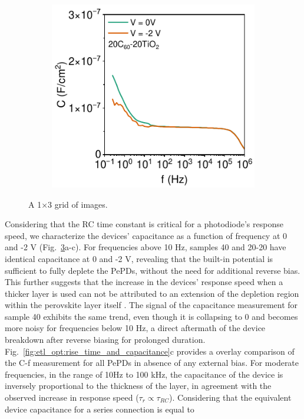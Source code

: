 \begin{figure}[htbp]
\begin{subfigure}{0.32\textwidth}
        \caption{}
        \label{}
    \end{subfigure}
    \hfill
    \begin{subfigure}{0.32\textwidth}
        \centering
        \includegraphics[width=\textwidth]{chapters/transport_layers/images/Cf_20_20.pdf}
        \caption{}
        \label{}
    \end{subfigure}
    
    \caption{A 1×3 grid of images.}
    \label{fig:etl_opt:cf_all}
\end{figure}



Considering that the RC time constant is critical for a photodiode's response speed, we characterize the devices' capacitance as a function of frequency at 0 and -2 V (Fig.~\ref{fig:etl_opt:cf_all}a-c). For frequencies above 10 Hz, samples 40 and 20-20 have identical capacitance at 0 and -2 V, revealing that the built-in potential is sufficient to fully deplete the PePDs, without the need for additional reverse bias. This further suggests that the increase in the devices' response speed when a thicker  layer is used can not be attributed to an extension of the depletion region within the perovskite layer itself \cite{Goushcha2017OnPhotodiodes}. The signal of the capacitance measurement for sample 40 exhibits the same trend, even though it is collapsing to 0 and becomes more noisy for frequencies below 10 Hz, a direct aftermath of the device breakdown after reverse biasing for prolonged duration. Fig.~\ref{fig:etl_opt:rise_time_and_capacitance}c provides a overlay comparison of the C-f measurement for all PePDs in absence of any external bias. For moderate frequencies, in the range of 10Hz to 100 kHz, the capacitance of the device is inversely proportional to the thickness of the  layer, in agreement with the observed increase in response speed ($\tau_r \propto \tau_{RC}$). Considering that the equivalent device capacitance for a series connection is equal to 
 

